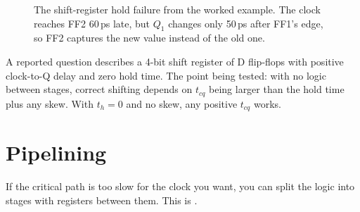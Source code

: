 \begin{figure}[h]
\centering
{}
\caption{The shift-register hold failure from the worked example. The clock reaches FF2 60\,ps late, but $Q_1$ changes only 50\,ps after FF1's edge, so FF2 captures the new value instead of the old one.}
\label{fig:holdskew}
\end{figure}

\begin{onoa}
A reported question describes a 4-bit shift register of D flip-flops with positive clock-to-Q delay and zero hold time. The point being tested: with no logic between stages, correct shifting depends on $t_{cq}$ being larger than the hold time plus any skew. With $t_h = 0$ and no skew, any positive $t_{cq}$ works.
\end{onoa}

\section{Pipelining}
\label{sec:pipelining}

If the critical path is too slow for the clock you want, you can split the logic into stages with registers between them. This is .

